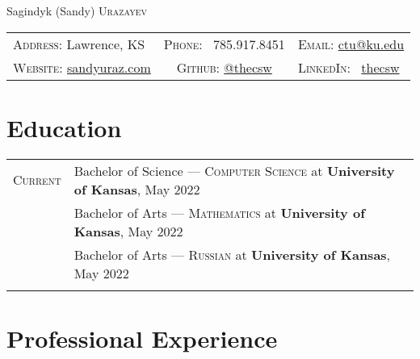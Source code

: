 \documentclass[a4paper, 10pt]{article}
\begin{document}
\pagestyle{empty}

\par{\centering
	{\Huge Sagindyk (Sandy) \textsc{Urazayev}
	}\smallskip\par}

\begin{center}
	\begin{tabular}{lcl}
		\textsc{Address:}   Lawrence, KS                                 &
		\textsc{Phone:} \quad \ 785.917.8451                             &
		\textsc{Email:} \quad \href{mailto:ctu@ku.edu}{ctu@ku.edu}         \\

		\textsc{Website:} \href{https://sandyuraz.com}{sandyuraz.com}    &
		\textsc{Github:} \quad \href{https://github.com/thecsw}{@thecsw} &
		\textsc{LinkedIn:} \ \href{https://linkedin.com/in/thecsw}{thecsw} \\
	\end{tabular}
\end{center}

\section{Education}

\begin{tabular}{rl}
	\textsc{Current}
	 & Bachelor of Science --- \textsc{Computer Science} at \normalsize\textbf{University of Kansas}, May 2022 \\
	 & Bachelor of Arts --- \textsc{Mathematics} at \normalsize\textbf{University of Kansas}, May 2022         \\
	 & Bachelor of Arts --- \textsc{Russian} at \normalsize\textbf{University of Kansas}, May 2022             \\

	\\
\end{tabular}

\section{Professional Experience}
\end{document}
